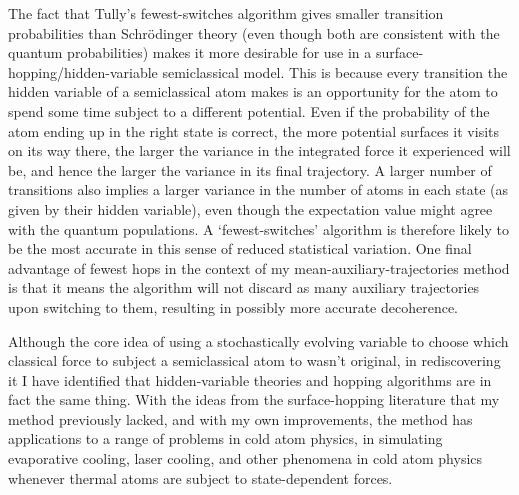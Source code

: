 The fact that Tully's fewest-switches algorithm gives smaller transition probabilities than Schr\"odinger theory (even though both are consistent with the quantum probabilities) makes it more desirable for use in a surface-hopping/hidden-variable semiclassical model. This is because every transition the hidden variable of a semiclassical atom makes is an opportunity for the atom to spend some time subject to a different potential. Even if the probability of the atom ending up in the right state is correct, the more potential surfaces it visits on its way there, the larger the variance in the integrated force it experienced will be, and hence the larger the variance in its final trajectory. A larger number of transitions also implies a larger variance in the number of atoms in each state (as given by their hidden variable), even though the expectation value might agree with the quantum populations. A `fewest-switches' algorithm is therefore likely to be the most accurate in this sense of reduced statistical variation. One final advantage of fewest hops in the context of my mean-auxiliary-trajectories method is that it means the algorithm will not discard as many auxiliary trajectories upon switching to them, resulting in possibly more accurate decoherence.


Although the core idea of using a stochastically evolving variable to choose which classical force to subject a semiclassical atom to wasn't original, in rediscovering it I have identified that hidden-variable theories and hopping algorithms are in fact the same thing. With the ideas from the surface-hopping literature that my method previously lacked, and with my own improvements, the method has applications to a range of problems in cold atom physics, in simulating evaporative cooling, laser cooling, and other phenomena in cold atom physics whenever thermal atoms are subject to state-dependent forces. 